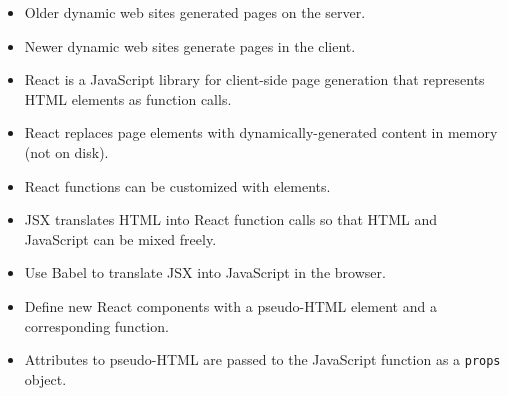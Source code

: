 \begin{itemize}
\item
  Older dynamic web sites generated pages on the server.
\item
  Newer dynamic web sites generate pages in the client.
\item
  React is a JavaScript library for client-side page generation that represents HTML elements as function calls.
\item
  React replaces page elements with dynamically-generated content in memory (not on disk).
\item
  React functions can be customized with elements.
\item
  JSX translates HTML into React function calls so that HTML and JavaScript can be mixed freely.
\item
  Use Babel to translate JSX into JavaScript in the browser.
\item
  Define new React components with a pseudo-HTML element and a corresponding function.
\item
  Attributes to pseudo-HTML are passed to the JavaScript function as a \texttt{props} object.
\end{itemize}
